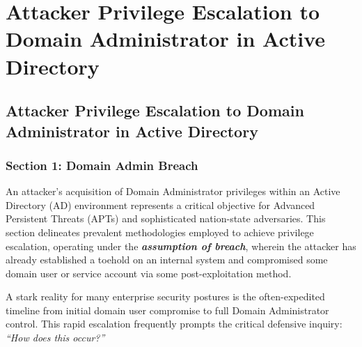 %
%
%
\chapter{Attacker Privilege Escalation to Domain Administrator in Active Directory}
\label{intro} %



\section{Attacker Privilege Escalation to Domain Administrator in Active Directory}

\subsection{Section 1: Domain Admin Breach}
An attacker’s acquisition of Domain Administrator privileges within an Active Directory (AD) environment represents a critical objective for Advanced Persistent Threats (APTs) and sophisticated nation-state adversaries. This section delineates prevalent methodologies employed to achieve privilege escalation, operating under the \textit{\textbf{assumption of breach}}, wherein the attacker has already established a toehold on an internal system and compromised some domain user or service account via some post-exploitation method.

A stark reality for many enterprise security postures is the often-expedited timeline from initial domain user compromise to full Domain Administrator control. This rapid escalation frequently prompts the critical defensive inquiry: \textit{“How does this occur?”}

